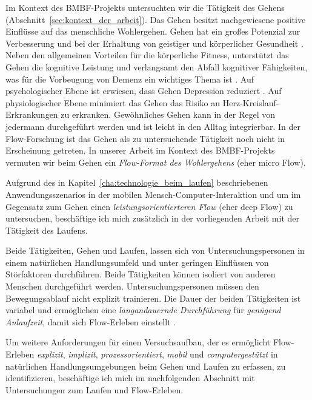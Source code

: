 

Im Kontext des \acs{BMBF}-Projekts untersuchten wir die Tätigkeit des Gehens (Abschnitt~\ref{sec:kontext_der_arbeit}). Das Gehen besitzt nachgewiesene positive Einflüsse auf das menschliche Wohlergehen. Gehen hat ein großes Potenzial zur Verbesserung und bei der Erhaltung von geistiger und körperlicher Gesundheit \citep{Lee2008, Morris1997}. Neben den allgemeinen Vorteilen für die körperliche Fitness, unterstützt das Gehen die kognitive Leistung und verlangsamt den Abfall kognitiver Fähigkeiten, was für die Vorbeugung von Demenz ein wichtiges Thema ist \citep{Weuve2004}. Auf psychologischer Ebene ist erwiesen, dass Gehen Depression reduziert \citep{Robertson2012}. Auf physiologischer Ebene minimiert das Gehen das Risiko an Herz-Kreislauf-Erkrankungen zu erkranken. Gewöhnliches Gehen kann in der Regel von jedermann durchgeführt werden und ist leicht in den Alltag integrierbar. In der Flow-Forschung ist das Gehen als zu untersuchende Tätigkeit noch nicht in Erscheinung getreten. In unserer Arbeit im Kontext des \acs{BMBF}-Projekts vermuten wir beim Gehen ein \emph{Flow-Format des Wohlergehens} (eher micro Flow). 

Aufgrund des in Kapitel~\ref{cha:technologie_beim_laufen} beschriebenen Anwendungsszenarios in der mobilen Mensch-Computer-Interaktion und um im Gegensatz zum Gehen einen \emph{leistungsorientierteren Flow} (eher deep Flow) zu untersuchen, beschäftige ich mich zusätzlich in der vorliegenden Arbeit mit der Tätigkeit des Laufens. 

Beide Tätigkeiten, Gehen und Laufen, lassen sich von Untersuchungspersonen in einem natürlichen Handlungsumfeld und unter geringen Einflüssen von Störfaktoren durchführen.  Beide Tätigkeiten können isoliert von anderen Menschen durchgeführt werden. Untersuchungspersonen müssen den Bewegungsablauf nicht explizit trainieren. Die Dauer der beiden Tätigkeiten ist variabel und ermöglichen eine \emph{langandauernde Durchführung} für \emph{genügend Anlaufzeit}, damit sich Flow-Erleben einstellt \citep[S.~109]{Henk2014}.

Um weitere Anforderungen für einen Versuchsaufbau, der es ermöglicht Flow-Erleben \emph{explizit}, \emph{implizit}, \emph{prozessorientiert}, \emph{mobil} und \emph{computergestützt} in natürlichen Handlungsumgebungen beim Gehen und Laufen zu erfassen, zu identifizieren, beschäftige ich mich im nachfolgenden Abschnitt mit Untersuchungen zum Laufen und Flow-Erleben. 
